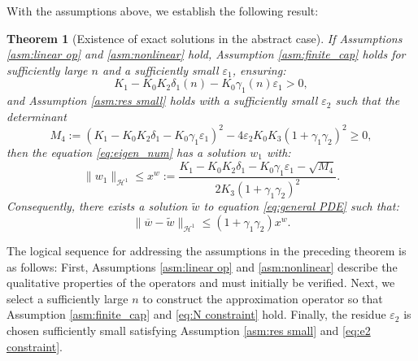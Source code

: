 \documentclass[11pt,a4paper]{article}
\numberwithin{equation}{section}
\newcommand{\assign}{:=}
\newtheorem{theorem}{Theorem}
\begin{document}
With the assumptions above, we establish the following result:

\begin{theorem}[Existence of exact solutions in the abstract case]
  \label{thm:general}If Assumptions \ref{asm:linear op} and
  \ref{asm:nonlinear} hold,  Assumption
  \ref{asm:finite_cap} holds for sufficiently large $n$ and a
  sufficiently small $\varepsilon_1$, ensuring:
  \begin{equation}
    K_1 - K_0 K_2 \delta_1 (n) - K_0 \gamma_1 (n) \varepsilon_1 > 0, \label{eq:N constraint}
  \end{equation}
  and Assumption \ref{asm:res small} holds with a
  sufficiently small $\varepsilon_2$ such that the determinant \begin{equation}M_4\assign(K_1 - K_0 K_2 \delta_1  - K_0 \gamma_1  \varepsilon_1)^2 - 4\varepsilon_2K_0 K_3 (1 +
    \gamma_1 \gamma_2)^2\geqslant0,\label{eq:e2 constraint}
  \end{equation} then the equation \eqref{eq:eigen_num} has a solution $w_1$ with:
  \begin{equation}
    \| w_1 \|_{\mathcal{H}^1} \leqslant  x^w\assign\frac{K_1 - K_0 K_2 \delta_1  - K_0 \gamma_1  \varepsilon_1-\sqrt{M_4}}{2K_3 (1 +
    \gamma_1 \gamma_2)^2}  . \label{solve}
  \end{equation}
  Consequently, there exists a solution $\widetilde{w}$ to equation
  \eqref{eq:general PDE} such that:
  \begin{equation*}
    \| \overline{w} - \widetilde{w} \|_{\mathcal{H}^1} \leqslant (1+\gamma_1\gamma_2)x^w . \label{eq:error bd}
  \end{equation*}
\end{theorem}

\begin{remark}
  The logical sequence for addressing the assumptions in the preceding theorem
  is as follows: First, Assumptions \ref{asm:linear op} and
  \ref{asm:nonlinear} describe the qualitative properties of the operators and
  must initially be verified. Next, we select a sufficiently large $n$ to construct the
  approximation operator so that Assumption \ref{asm:finite_cap} and \eqref{eq:N constraint} hold. Finally, the residue $\varepsilon_2$ is chosen
  sufficiently small satisfying Assumption \ref{asm:res small} and \eqref{eq:e2 constraint}.
 
\end{remark}
\end{document}
